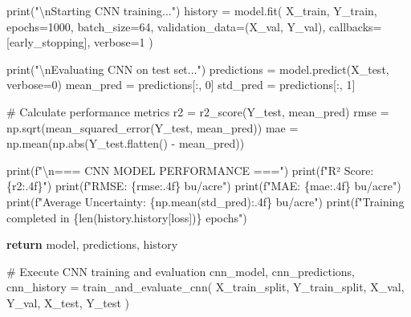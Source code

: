 \documentclass[
  letterpaper,
  DIV=11,
  numbers=noendperiod]{scrreprt}
\newenvironment{Shaded}{\begin{snugshade}}{\end{snugshade}}
\newcommand{\BuiltInTok}[1]{\textcolor[rgb]{0.00,0.23,0.31}{#1}}
\newcommand{\CharTok}[1]{\textcolor[rgb]{0.13,0.47,0.30}{#1}}
\newcommand{\CommentTok}[1]{\textcolor[rgb]{0.37,0.37,0.37}{#1}}
\newcommand{\ControlFlowTok}[1]{\textcolor[rgb]{0.00,0.23,0.31}{\textbf{#1}}}
\newcommand{\DecValTok}[1]{\textcolor[rgb]{0.68,0.00,0.00}{#1}}
\newcommand{\NormalTok}[1]{\textcolor[rgb]{0.00,0.23,0.31}{#1}}
\newcommand{\OperatorTok}[1]{\textcolor[rgb]{0.37,0.37,0.37}{#1}}
\newcommand{\SpecialCharTok}[1]{\textcolor[rgb]{0.37,0.37,0.37}{#1}}
\newcommand{\SpecialStringTok}[1]{\textcolor[rgb]{0.13,0.47,0.30}{#1}}
\newcommand{\StringTok}[1]{\textcolor[rgb]{0.13,0.47,0.30}{#1}}
\begin{document}
\begin{Shaded}
\begin{Highlighting}[]
    \BuiltInTok{print}\NormalTok{(}\StringTok{"}\CharTok{\textbackslash{}n}\StringTok{Starting CNN training..."}\NormalTok{)}
\NormalTok{    history }\OperatorTok{=}\NormalTok{ model.fit(}
\NormalTok{        X\_train, Y\_train,}
\NormalTok{        epochs}\OperatorTok{=}\DecValTok{1000}\NormalTok{,}
\NormalTok{        batch\_size}\OperatorTok{=}\DecValTok{64}\NormalTok{,}
\NormalTok{        validation\_data}\OperatorTok{=}\NormalTok{(X\_val, Y\_val),}
\NormalTok{        callbacks}\OperatorTok{=}\NormalTok{[early\_stopping],}
\NormalTok{        verbose}\OperatorTok{=}\DecValTok{1}
\NormalTok{    )}

    \BuiltInTok{print}\NormalTok{(}\StringTok{"}\CharTok{\textbackslash{}n}\StringTok{Evaluating CNN on test set..."}\NormalTok{)}
\NormalTok{    predictions }\OperatorTok{=}\NormalTok{ model.predict(X\_test, verbose}\OperatorTok{=}\DecValTok{0}\NormalTok{)}
\NormalTok{    mean\_pred }\OperatorTok{=}\NormalTok{ predictions[:, }\DecValTok{0}\NormalTok{]}
\NormalTok{    std\_pred }\OperatorTok{=}\NormalTok{ predictions[:, }\DecValTok{1}\NormalTok{]}

    \CommentTok{\# Calculate performance metrics}
\NormalTok{    r2 }\OperatorTok{=}\NormalTok{ r2\_score(Y\_test, mean\_pred)}
\NormalTok{    rmse }\OperatorTok{=}\NormalTok{ np.sqrt(mean\_squared\_error(Y\_test, mean\_pred))}
\NormalTok{    mae }\OperatorTok{=}\NormalTok{ np.mean(np.}\BuiltInTok{abs}\NormalTok{(Y\_test.flatten() }\OperatorTok{{-}}\NormalTok{ mean\_pred))}

    \BuiltInTok{print}\NormalTok{(}\SpecialStringTok{f"}\CharTok{\textbackslash{}n}\SpecialStringTok{=== CNN MODEL PERFORMANCE ==="}\NormalTok{)}
    \BuiltInTok{print}\NormalTok{(}\SpecialStringTok{f"R² Score: }\SpecialCharTok{\{}\NormalTok{r2}\SpecialCharTok{:.4f\}}\SpecialStringTok{"}\NormalTok{)}
    \BuiltInTok{print}\NormalTok{(}\SpecialStringTok{f"RMSE: }\SpecialCharTok{\{}\NormalTok{rmse}\SpecialCharTok{:.4f\}}\SpecialStringTok{ bu/acre"}\NormalTok{)}
    \BuiltInTok{print}\NormalTok{(}\SpecialStringTok{f"MAE: }\SpecialCharTok{\{}\NormalTok{mae}\SpecialCharTok{:.4f\}}\SpecialStringTok{ bu/acre"}\NormalTok{)}
    \BuiltInTok{print}\NormalTok{(}\SpecialStringTok{f"Average Uncertainty: }\SpecialCharTok{\{}\NormalTok{np}\SpecialCharTok{.}\NormalTok{mean(std\_pred)}\SpecialCharTok{:.4f\}}\SpecialStringTok{ bu/acre"}\NormalTok{)}
    \BuiltInTok{print}\NormalTok{(}\SpecialStringTok{f"Training completed in }\SpecialCharTok{\{}\BuiltInTok{len}\NormalTok{(history.history[}\StringTok{\textquotesingle{}loss\textquotesingle{}}\NormalTok{])}\SpecialCharTok{\}}\SpecialStringTok{ epochs"}\NormalTok{)}

    \ControlFlowTok{return}\NormalTok{ model, predictions, history}

\CommentTok{\# Execute CNN training and evaluation}
\NormalTok{cnn\_model, cnn\_predictions, cnn\_history }\OperatorTok{=}\NormalTok{ train\_and\_evaluate\_cnn(}
\NormalTok{    X\_train\_split, Y\_train\_split,}
\NormalTok{    X\_val, Y\_val,}
\NormalTok{    X\_test, Y\_test}
\NormalTok{)}
\end{Highlighting}
\end{Shaded}
\end{document}
